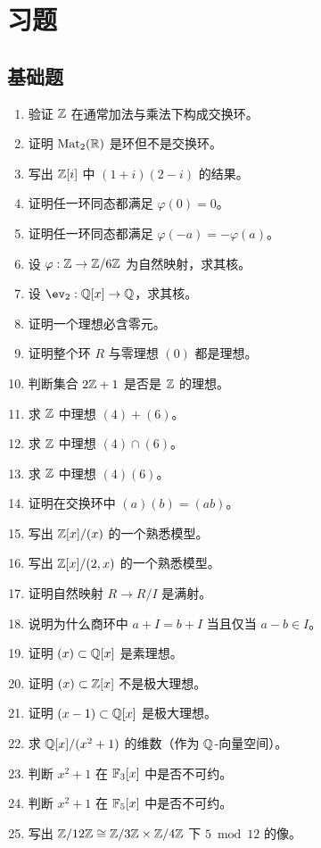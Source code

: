\section*{习题}
\subsection*{基础题}
\begin{enumerate}[label=\textbf{\arabic*.}, leftmargin=*, itemsep=0.5em]
\item \basic 验证 $\mathbb{Z}$ 在通常加法与乘法下构成交换环。
\item \basic 证明 $\mathrm{Mat}_2(\mathbb{R})$ 是环但不是交换环。
\item \basic 写出 $\mathbb{Z}[i]$ 中 $(1+i)(2-i)$ 的结果。
\item \basic 证明任一环同态都满足 $\varphi(0)=0$。
\item \basic 证明任一环同态都满足 $\varphi(-a)=-\varphi(a)$。
\item \basic 设 $\varphi:\mathbb{Z}\to \mathbb{Z}/6\mathbb{Z}$ 为自然映射，求其核。
\item \basic 设 $\ev_2:\Q[x]\to \Q$，求其核。
\item \basic 证明一个理想必含零元。
\item \basic 证明整个环 $R$ 与零理想 $(0)$ 都是理想。
\item \basic 判断集合 $2\mathbb{Z}+1$ 是否是 $\mathbb{Z}$ 的理想。
\item \basic 求 $\mathbb{Z}$ 中理想 $(4)+(6)$。
\item \basic 求 $\mathbb{Z}$ 中理想 $(4)\cap(6)$。
\item \basic 求 $\mathbb{Z}$ 中理想 $(4)(6)$。
\item \basic 证明在交换环中 $(a)(b)=(ab)$。
\item \basic 写出 $\mathbb{Z}[x]/(x)$ 的一个熟悉模型。
\item \basic 写出 $\mathbb{Z}[x]/(2,x)$ 的一个熟悉模型。
\item \basic 证明自然映射 $R\to R/I$ 是满射。
\item \basic 说明为什么商环中 $a+I=b+I$ 当且仅当 $a-b\in I$。
\item \basic 证明 $(x)\subset \mathbb{Q}[x]$ 是素理想。
\item \basic 证明 $(x)\subset \mathbb{Z}[x]$ 不是极大理想。
\item \basic 证明 $(x-1)\subset \mathbb{Q}[x]$ 是极大理想。
\item \basic 求 $\mathbb{Q}[x]/(x^2+1)$ 的维数（作为 $\mathbb{Q}$-向量空间）。
\item \basic 判断 $x^2+1$ 在 $\mathbb{F}_3[x]$ 中是否不可约。
\item \basic 判断 $x^2+1$ 在 $\mathbb{F}_5[x]$ 中是否不可约。
\item \basic 写出 $\mathbb{Z}/12\mathbb{Z}\cong \mathbb{Z}/3\mathbb{Z}\times \mathbb{Z}/4\mathbb{Z}$ 下 $5\bmod 12$ 的像。
\end{enumerate}

